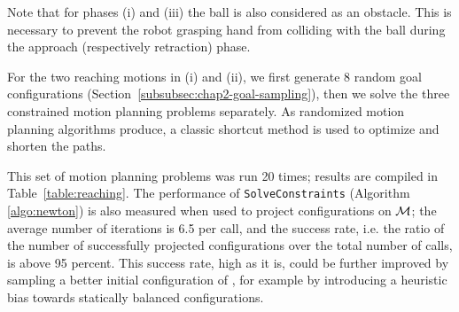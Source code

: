 Note that for phases (i) and (iii) the ball is also considered as an
obstacle. This is necessary to prevent the robot grasping hand from
colliding with the ball during the approach (respectively retraction)
phase.

For the two reaching motions in (i) and (ii), we first generate 8
random goal configurations
(Section~\ref{subsubsec:chap2-goal-sampling}), then we solve the three
constrained motion planning problems separately. As randomized motion
planning algorithms produce, a classic shortcut method is used to
optimize and shorten the paths.

This set of motion planning problems was run 20 times; results are
compiled in Table~\ref{table:reaching}. The performance of
\texttt{SolveConstraints} (Algorithm \ref{algo:newton}) is also
measured when used to project configurations on $\mathcal{M}$; the
average number of iterations is 6.5 per call, and the success rate,
i.e. the ratio of the number of successfully projected configurations
over the total number of calls, is above 95 percent. This success
rate, high as it is, could be further improved by sampling a better
initial configuration of \cspace, for example by introducing a
heuristic bias towards statically balanced configurations.

